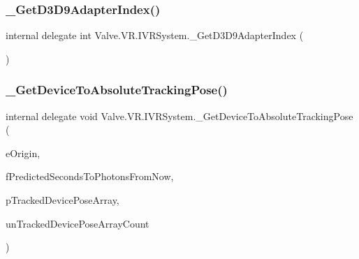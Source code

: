 \mbox{\label{struct_valve_1_1_v_r_1_1_i_v_r_system_af8628eb30b5b12b64585d57ebc093ff9}} 
\subsubsection{\texorpdfstring{\_GetD3D9AdapterIndex()}{\_GetD3D9AdapterIndex()}}
{\footnotesize\ttfamily internal delegate int Valve.\+V\+R.\+I\+V\+R\+System.\+\_\+\+Get\+D3\+D9\+Adapter\+Index (\begin{DoxyParamCaption}{ }\end{DoxyParamCaption})}

\mbox{\label{struct_valve_1_1_v_r_1_1_i_v_r_system_aaea53504ce1e2a5c54baaaa6d1ad2d40}} 
\subsubsection{\texorpdfstring{\_GetDeviceToAbsoluteTrackingPose()}{\_GetDeviceToAbsoluteTrackingPose()}}
{\footnotesize\ttfamily internal delegate void Valve.\+V\+R.\+I\+V\+R\+System.\+\_\+\+Get\+Device\+To\+Absolute\+Tracking\+Pose (\begin{DoxyParamCaption}\item[{\mbox{\hyperlink{namespace_valve_1_1_v_r_a29be99a3c2f780157bd490db06a7f12f}{E\+Tracking\+Universe\+Origin}}}]{e\+Origin,  }\item[{float}]{f\+Predicted\+Seconds\+To\+Photons\+From\+Now,  }\item[{\mbox{[}\+In, Out\mbox{]} \mbox{\hyperlink{struct_valve_1_1_v_r_1_1_tracked_device_pose__t}{Tracked\+Device\+Pose\+\_\+t}} \mbox{[}$\,$\mbox{]}}]{p\+Tracked\+Device\+Pose\+Array,  }\item[{uint}]{un\+Tracked\+Device\+Pose\+Array\+Count }\end{DoxyParamCaption})}

\mbox{\label{struct_valve_1_1_v_r_1_1_i_v_r_system_ab24a286fab0641489f5da8a338858169}} 
